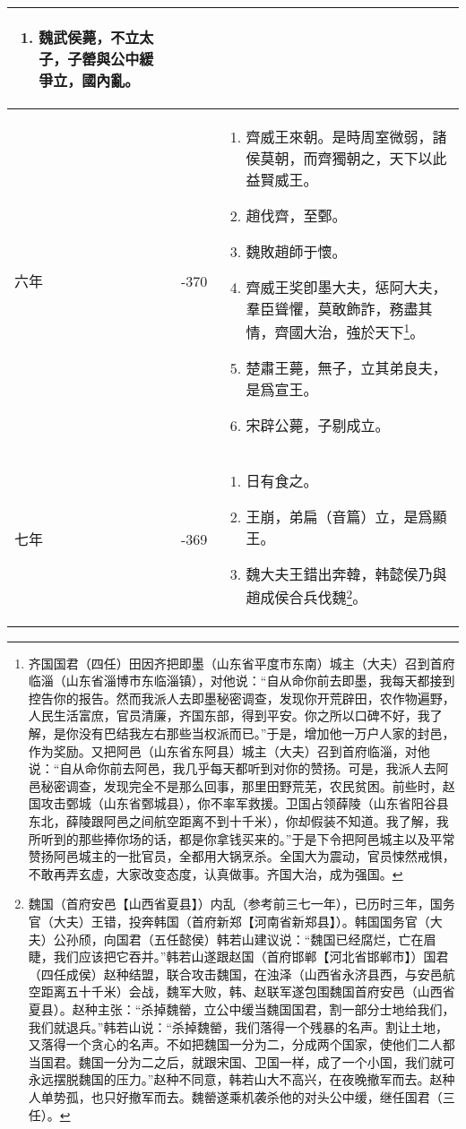 \begin{longtable}{|>{\centering\scriptsize}m{2em}|>{\centering\scriptsize}m{1.3em}|>{\centering}m{8.8em}|}
\begin{enumerate}
  \item 魏武侯薨，不立太子，子罃與公中緩爭立，國內亂。
  \end{enumerate} \tabularnewline\hline
  六年 & -370 & \begin{enumerate}
    \tiny
  \item 齊威王來朝。是時周室微弱，諸侯莫朝，而齊獨朝之，天下以此益賢威王。
  \item 趙伐齊，至鄄。
  \item 魏敗趙師于懷。
  \item 齊威王奖卽墨大夫，惩阿大夫，羣臣聳懼，莫敢飾詐，務盡其情，齊國大治，強於天下\footnote{齐国国君（四任）田因齐把即墨（山东省平度市东南）城主（大夫）召到首府临淄（山东省淄博市东临淄镇），对他说：“自从命你前去即墨，我每天都接到控告你的报告。然而我派人去即墨秘密调查，发现你开荒辟田，农作物遍野，人民生活富庶，官员清廉，齐国东部，得到平安。你之所以口碑不好，我了解，是你没有巴结我左右那些当权派而已。”于是，增加他一万户人家的封邑，作为奖励。又把阿邑（山东省东阿县）城主（大夫）召到首府临淄，对他说：“自从命你前去阿邑，我几乎每天都听到对你的赞扬。可是，我派人去阿邑秘密调查，发现完全不是那么回事，那里田野荒芜，农民贫困。前些时，赵国攻击鄄城（山东省鄄城县），你不率军救援。卫国占领薛陵（山东省阳谷县东北，薛陵跟阿邑之间航空距离不到十千米），你却假装不知道。我了解，我所听到的那些捧你场的话，都是你拿钱买来的。”于是下令把阿邑城主以及平常赞扬阿邑城主的一批官员，全都用大锅烹杀。全国大为震动，官员悚然戒惧，不敢再弄玄虚，大家改变态度，认真做事。齐国大治，成为强国。}。
  \item 楚肅王薨，無子，立其弟良夫，是爲宣王。
  \item 宋辟公薨，子剔成立。
  \end{enumerate} \tabularnewline\hline \newpage
  七年 & -369 & \begin{enumerate}
    \tiny
  \item 日有食之。
  \item 王崩，弟扁（音篇）立，是爲顯王。
  \item 魏大夫王錯出奔韓，韩懿侯乃與趙成侯合兵伐魏\footnote{魏国（首府安邑【山西省夏县】）内乱（参考前三七一年），已历时三年，国务官（大夫）王错，投奔韩国（首府新郑【河南省新郑县】）。韩国国务官（大夫）公孙颀，向国君（五任懿侯）韩若山建议说：“魏国已经腐烂，亡在眉睫，我们应该把它吞并。”韩若山遂跟赵国（首府邯郸【河北省邯郸市】）国君（四任成侯）赵种结盟，联合攻击魏国，在浊泽（山西省永济县西，与安邑航空距离五十千米）会战，魏军大败，韩、赵联军遂包围魏国首府安邑（山西省夏县）。赵种主张：“杀掉魏罃，立公中缓当魏国国君，割一部分士地给我们，我们就退兵。”韩若山说：“杀掉魏罃，我们落得一个残暴的名声。割让土地，又落得一个贪心的名声。不如把魏国一分为二，分成两个国家，使他们二人都当国君。魏国一分为二之后，就跟宋国、卫国一样，成了一个小国，我们就可永远摆脱魏国的压力。”赵种不同意，韩若山大不高兴，在夜晚撤军而去。赵种人单势孤，也只好撤军而去。魏罃遂乘机袭杀他的对头公中缓，继任国君（三任）。}。
  \end{enumerate} \tabularnewline
  \bottomrule
\end{longtable}

